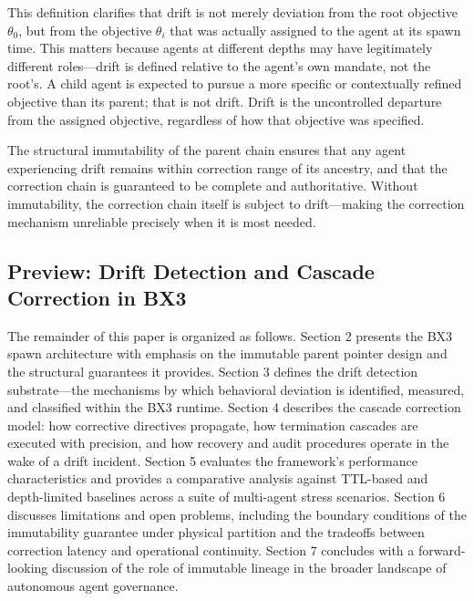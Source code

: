 This definition clarifies that drift is not merely deviation from the root objective $\theta_0$, but from the objective $\theta_i$ that was actually assigned to the agent at its spawn time. This matters because agents at different depths may have legitimately different roles—drift is defined relative to the agent's own mandate, not the root's. A child agent is expected to pursue a more specific or contextually refined objective than its parent; that is not drift. Drift is the uncontrolled departure from the assigned objective, regardless of how that objective was specified.

The structural immutability of the parent chain ensures that any agent experiencing drift remains within correction range of its ancestry, and that the correction chain is guaranteed to be complete and authoritative. Without immutability, the correction chain itself is subject to drift—making the correction mechanism unreliable precisely when it is most needed.

\subsection{Preview: Drift Detection and Cascade Correction in BX3}

The remainder of this paper is organized as follows. Section 2 presents the BX3 spawn architecture with emphasis on the immutable parent pointer design and the structural guarantees it provides. Section 3 defines the drift detection substrate—the mechanisms by which behavioral deviation is identified, measured, and classified within the BX3 runtime. Section 4 describes the cascade correction model: how corrective directives propagate, how termination cascades are executed with precision, and how recovery and audit procedures operate in the wake of a drift incident. Section 5 evaluates the framework's performance characteristics and provides a comparative analysis against TTL-based and depth-limited baselines across a suite of multi-agent stress scenarios. Section 6 discusses limitations and open problems, including the boundary conditions of the immutability guarantee under physical partition and the tradeoffs between correction latency and operational continuity. Section 7 concludes with a forward-looking discussion of the role of immutable lineage in the broader landscape of autonomous agent governance.

